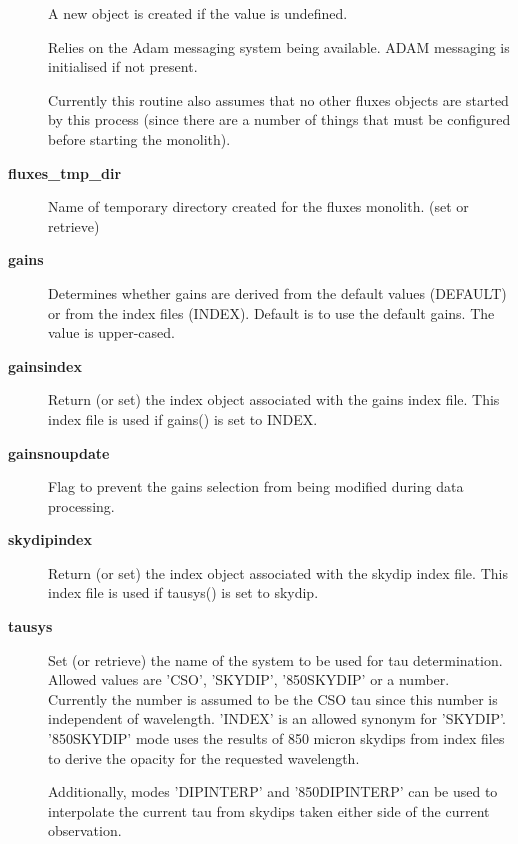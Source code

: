 \begin{description}
A new object is created if the value is undefined.



Relies on the Adam messaging system being available.
ADAM messaging is initialised if not present.



Currently this routine also assumes that no other fluxes
objects are started by this process (since there are a number
of things that must be configured before starting the monolith).

\item[\textbf{fluxes\_tmp\_dir}] \mbox{}

Name of temporary directory created for the fluxes monolith.
(set or retrieve)

\item[\textbf{gains}] \mbox{}

Determines whether gains are derived from the default values
(DEFAULT) or from the index files (INDEX). Default is to
use the default gains. The value is upper-cased.

\item[\textbf{gainsindex}] \mbox{}

Return (or set) the index object associated with the gains
index file. This index file is used if gains() is set to INDEX.

\item[\textbf{gainsnoupdate}] \mbox{}

Flag to prevent the gains selection from being modified during data
processing.

\item[\textbf{skydipindex}] \mbox{}

Return (or set) the index object associated with the skydip
index file. This index file is used if tausys() is set to skydip.

\item[\textbf{tausys}] \mbox{}

Set (or retrieve) the name of the system to be used for
tau determination. Allowed values are 'CSO', 'SKYDIP',
'850SKYDIP' or a number. Currently the number is assumed to be the 
CSO tau since this number is independent of wavelength.
'INDEX' is an allowed synonym for 'SKYDIP'. '850SKYDIP'
mode uses the results of 850 micron skydips from index
files to derive the opacity for the requested wavelength.



Additionally, modes 'DIPINTERP' and '850DIPINTERP' can be 
used to interpolate the current tau from skydips taken
either side of the current observation.




\end{description}
